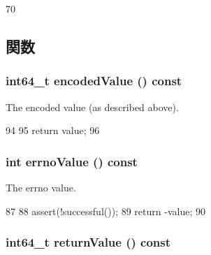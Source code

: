 \begin{DoxyCode}
70 {}
\end{DoxyCode}


\subsection{関数}
\hypertarget{classSyscallReturn_a57588b532e202b278d875d4e4b1f0e9b}{
\subsubsection[{encodedValue}]{\setlength{\rightskip}{0pt plus 5cm}int64\_\-t encodedValue () const}}
\label{classSyscallReturn_a57588b532e202b278d875d4e4b1f0e9b}


The encoded value (as described above). 


\begin{DoxyCode}
94     {
95         return value;
96     }
\end{DoxyCode}
\hypertarget{classSyscallReturn_a0d37ad312e6fa6704e35c2008d21ec0a}{
\subsubsection[{errnoValue}]{\setlength{\rightskip}{0pt plus 5cm}int errnoValue () const}}
\label{classSyscallReturn_a0d37ad312e6fa6704e35c2008d21ec0a}


The errno value. 


\begin{DoxyCode}
87     {
88         assert(!successful());
89         return -value;
90     }
\end{DoxyCode}
\hypertarget{classSyscallReturn_ab1977b33a1e2019fef23edea0d7e6f2b}{
\subsubsection[{returnValue}]{\setlength{\rightskip}{0pt plus 5cm}int64\_\-t returnValue () const}}
\label{classSyscallReturn_ab1977b33a1e2019fef23edea0d7e6f2b}


